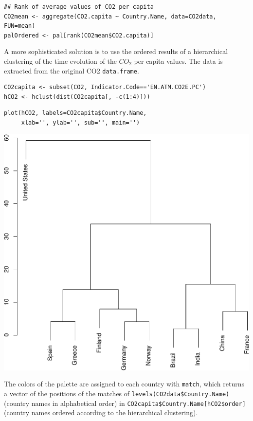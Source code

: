 \lstset{language=R}
\begin{lstlisting}
## Rank of average values of CO2 per capita
CO2mean <- aggregate(CO2.capita ~ Country.Name, data=CO2data, FUN=mean)
palOrdered <- pal[rank(CO2mean$CO2.capita)]
\end{lstlisting}

A more sophisticated solution is to use the ordered results of a
hierarchical clustering of the time evolution of the $CO_2$ per
capita values. The data is extracted from the original CO2
\texttt{data.frame}.  

\lstset{language=R}
\begin{lstlisting}
CO2capita <- subset(CO2, Indicator.Code=='EN.ATM.CO2E.PC')
hCO2 <- hclust(dist(CO2capita[, -c(1:4)]))
\end{lstlisting}


\lstset{language=R}
\begin{lstlisting}
plot(hCO2, labels=CO2capita$Country.Name,
     xlab='', ylab='', sub='', main='')
\end{lstlisting}

\includegraphics[width=.9\linewidth]{figs/hclust.pdf}

The colors of the palette are assigned to each country with \texttt{match},
which returns a vector of the positions of the matches of
\texttt{levels(CO2data\$Country.Name)} (country names in alphabetical order)
in \texttt{CO2capita\$Country.Name[hCO2\$order]} (country names ordered
according to the hierarchical clustering). 

